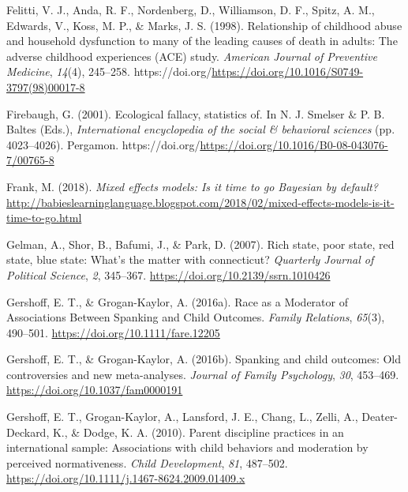 \documentclass[
  letterpaper,
  DIV=11,
  numbers=noendperiod]{scrreprt}
\newlength{\cslhangindent}
\newlength{\cslentryspacingunit} %
\newenvironment{CSLReferences}[2] %
 {%
  \setlength{\parindent}{0pt}
  \ifodd #1
  \let\oldpar\par
  \def\par{\hangindent=\cslhangindent\oldpar}
  \fi
  \setlength{\parskip}{#2\cslentryspacingunit}
 }%
 {}
\begin{document}
\begin{CSLReferences}{1}{0}
\leavevmode{}%
Felitti, V. J., Anda, R. F., Nordenberg, D., Williamson, D. F., Spitz,
A. M., Edwards, V., Koss, M. P., \& Marks, J. S. (1998). Relationship of
childhood abuse and household dysfunction to many of the leading causes
of death in adults: The adverse childhood experiences (ACE) study.
\emph{American Journal of Preventive Medicine}, \emph{14}(4), 245--258.
https://doi.org/\url{https://doi.org/10.1016/S0749-3797(98)00017-8}

\leavevmode{}%
Firebaugh, G. (2001). Ecological fallacy, statistics of. In N. J.
Smelser \& P. B. Baltes (Eds.), \emph{International encyclopedia of the
social \& behavioral sciences} (pp. 4023--4026). Pergamon.
https://doi.org/\url{https://doi.org/10.1016/B0-08-043076-7/00765-8}

\leavevmode{}%
Frank, M. (2018). \emph{Mixed effects models: Is it time to go
{B}ayesian by default?}
\url{http://babieslearninglanguage.blogspot.com/2018/02/mixed-effects-models-is-it-time-to-go.html}

\leavevmode{}%
Gelman, A., Shor, B., Bafumi, J., \& Park, D. (2007). Rich state, poor
state, red state, blue state: What's the matter with connecticut?
\emph{Quarterly Journal of Political Science}, \emph{2}, 345--367.
\url{https://doi.org/10.2139/ssrn.1010426}

\leavevmode{}%
Gershoff, E. T., \& Grogan-Kaylor, A. (2016a). {Race as a Moderator of
Associations Between Spanking and Child Outcomes}. \emph{Family
Relations}, \emph{65}(3), 490--501.
\url{https://doi.org/10.1111/fare.12205}

\leavevmode{}%
Gershoff, E. T., \& Grogan-Kaylor, A. (2016b). Spanking and child
outcomes: Old controversies and new meta-analyses. \emph{Journal of
Family Psychology}, \emph{30}, 453--469.
\url{https://doi.org/10.1037/fam0000191}

\leavevmode{}%
Gershoff, E. T., Grogan-Kaylor, A., Lansford, J. E., Chang, L., Zelli,
A., Deater-Deckard, K., \& Dodge, K. A. (2010). Parent discipline
practices in an international sample: Associations with child behaviors
and moderation by perceived normativeness. \emph{Child Development},
\emph{81}, 487--502.
\url{https://doi.org/10.1111/j.1467-8624.2009.01409.x}


\end{CSLReferences}
\end{document}
